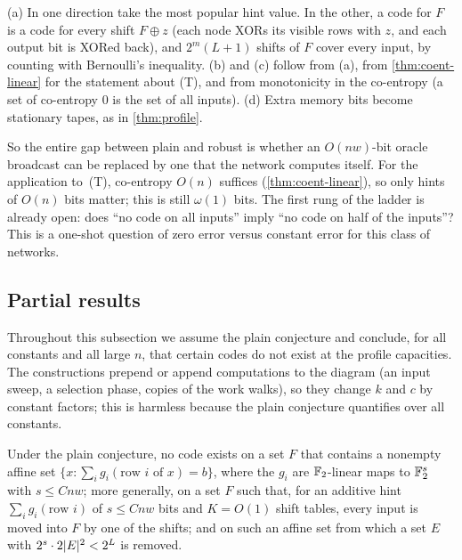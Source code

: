 \begin{outline}
(a) In one direction take the most popular hint value. In the other, a code for $F$ is a code for
every shift $F\oplus z$ (each node XORs its visible rows with $z$, and each output bit is XORed back),
and $2^m(L+1)$ shifts of $F$ cover every input, by counting with Bernoulli's inequality. (b) and (c)
follow from (a), from \cref{thm:coent-linear} for the statement about (T), and from monotonicity in the
co-entropy (a set of co-entropy $0$ is the set of all inputs). (d) Extra memory bits become stationary tapes, as in \cref{thm:profile}.
\end{outline}

So the entire gap between plain and robust is whether an $O(nw)$-bit oracle broadcast can be
replaced by one that the network computes itself. For the application to~(T), co-entropy $O(n)$
suffices (\cref{thm:coent-linear}), so only hints of $O(n)$ bits matter; this is still $\omega(1)$
bits. The first rung of the ladder is already open: does ``no code on all inputs'' imply ``no code
on half of the inputs''? This is a one-shot question of zero error versus constant error for this
class of networks.

\subsection{Partial results}

Throughout this subsection we assume the plain conjecture  and conclude, for all
constants and all large $n$, that certain codes do not exist at the profile capacities. The
constructions prepend or append computations to the diagram (an input sweep, a selection phase,
copies of the work walks), so they change $k$ and $c$ by constant factors; this is harmless because
the plain conjecture quantifies over all constants.

\begin{theorem}\label{thm:pr-affine}
Under the plain conjecture, no code exists on a set $F$ that contains a nonempty affine set
$\{x:\sum_ig_i(\text{row }i\text{ of }x)=b\}$, where the $g_i$ are $\mathbb{F}_2$-linear maps to $\mathbb{F}_2^s$ with
$s\le Cnw$; more generally, on a set $F$ such that, for an additive hint $\sum_ig_i(\text{row }i)$ of
$s\le Cnw$ bits and $K=O(1)$ shift tables, every input is moved into $F$ by one of the shifts; and on
such an affine set from which a set $E$ with $2^s\cdot2\lvert E \rvert^2<2^L$ is removed.
\end{theorem}

